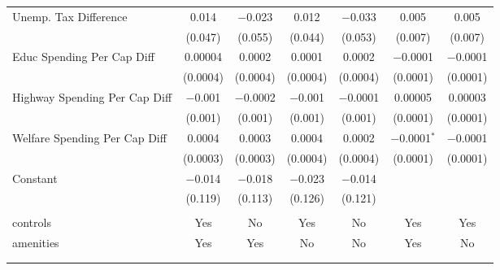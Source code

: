 \begin{table}[!htbp]
\begin{tabular}{@{\extracolsep{5pt}}lcccccc}
  Unemp. Tax Difference & 0.014 & $-$0.023 & 0.012 & $-$0.033 & 0.005 & 0.005 \\ 
  & (0.047) & (0.055) & (0.044) & (0.053) & (0.007) & (0.007) \\ 
  Educ Spending Per Cap Diff & 0.00004 & 0.0002 & 0.0001 & 0.0002 & $-$0.0001 & $-$0.0001 \\ 
  & (0.0004) & (0.0004) & (0.0004) & (0.0004) & (0.0001) & (0.0001) \\ 
  Highway Spending Per Cap Diff & $-$0.001 & $-$0.0002 & $-$0.001 & $-$0.0001 & 0.00005 & 0.00003 \\ 
  & (0.001) & (0.001) & (0.001) & (0.001) & (0.0001) & (0.0001) \\ 
  Welfare Spending Per Cap Diff & 0.0004 & 0.0003 & 0.0004 & 0.0002 & $-$0.0001$^{*}$ & $-$0.0001 \\ 
  & (0.0003) & (0.0003) & (0.0004) & (0.0004) & (0.0001) & (0.0001) \\ 
  Constant & $-$0.014 & $-$0.018 & $-$0.023 & $-$0.014 &  &  \\ 
  & (0.119) & (0.113) & (0.126) & (0.121) &  &  \\ 
 \hline \\[-1.8ex] 
controls & Yes & No & Yes & No & Yes & Yes \\ 
amenities & Yes & Yes & No & No & Yes & No \\ 
\hline \\[-1.8ex] 
\hline 
\hline \\[-1.8ex] 
\end{tabular} 
\end{table} 
